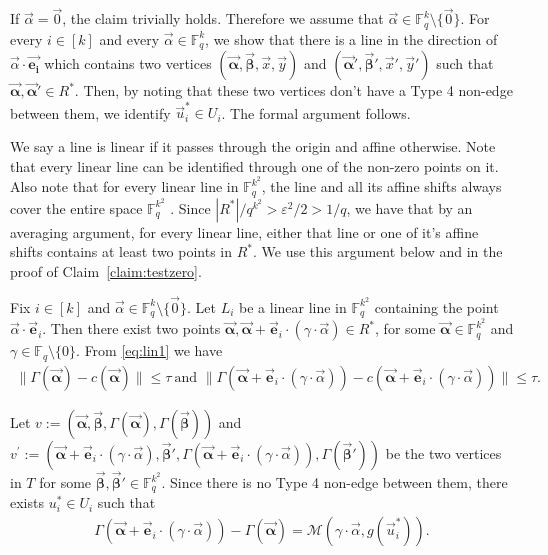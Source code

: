 \documentclass[10pt,a4paper]{article}
\newcommand{\F}{\mathbb{F}}
\renewcommand{\le}{ \leqslant}
\newcommand{\alphab}{\vec{\bm{\alpha}}}
\newcommand{\betab}{\vec{\bm{\beta}}}
\renewcommand{\kappa}{\tau}
\newcommand{\M}{\mathcal{M}}
\begin{document}
%

If $\vec{\alpha}=\vec{0}$, the claim trivially holds. Therefore we assume that $\vec{\alpha}\in\F_q^k\setminus \{\vec{0}\}$. For every $i\in[k]$ and every $\vec{\alpha}\in \F_q^k$, we show that there is a line in the direction of $\vec{\alpha}\cdot \vec{\bm{e_i}}$ which contains two vertices $(\alphab,\betab,\vec{x},\vec{y})$ and  $(\alphab',\betab',\vec{x}',\vec{y}')$ such that  $\alphab,\alphab'\in R^\ast$. Then, by noting that these two vertices don't have a Type 4 non-edge between them, we identify $\vec{u}_i^\ast\in U_i$. The formal argument follows.

We say a line is linear if it passes through the origin and affine otherwise. Note that every linear line can be identified through one of the non-zero points on it. Also note that for every linear line in $\F_q^{k^2}$, the line   and all its affine shifts always cover the entire space $\F_q^{k^2}$ . 
 Since $|{R}^\ast|/q^{k^2}>\varepsilon^2/2>1/q$, we have that  by an averaging argument,  for every linear line, either that line or one of it's affine shifts   contains at least two points in $R^\ast$. We use this argument below and in the proof of Claim~\ref{claim:testzero}.


Fix $i\in[k]$ and $\vec{\alpha}\in\F_q^k\setminus \{\vec{0}\}$. Let $L_i$ be a linear line in $\F_q^{k^2}$  containing the point  $\vec{\alpha}\cdot \vec{\bm e}_i$. Then there exist two points  $\vec{\bm{\alpha}},\vec{\bm{\alpha}}+\vec{\bm e}_i\cdot (\gamma\cdot\vec{\alpha})\in  {R}^\ast$, for some $\alphab\in\F_q^{k^2}$ and $\gamma\in \F_q\setminus\{0\}$. From \eqref{eq:lin1} we have
\begin{align}
\|\Gamma(\vec{\bm{\alpha}})-c(\vec{\bm{\alpha}})\|\le \kappa\ \text{and } \|\Gamma(\vec{\bm{\alpha}}+\vec{\bm e}_i\cdot (\gamma\cdot\vec{\alpha}))-c(\vec{\bm{\alpha}}+\vec{\bm e}_i\cdot (\gamma\cdot\vec{\alpha}))\|\le \kappa. 
\label{eq:lin2}
\end{align}



Let $v:=(\alphab,\betab,\Gamma(\alphab),\Gamma(\betab))$ and 
$v^{\prime}:=(\alphab+\vec{\bm e}_i\cdot (\gamma\cdot\vec{\alpha}),\betab',\Gamma(\alphab+\vec{\bm e}_i\cdot (\gamma\cdot\vec{\alpha})),\Gamma(\betab'))$  be the two vertices in $T$ for some $\betab,\betab'\in \F_q^{k^2}$. Since there  is no Type 4 non-edge between them,  there exists $u_i^\ast\in U_i$ such that  
\begin{align}
\Gamma(\alphab+\vec{\bm e}_i\cdot (\gamma\cdot\vec{\alpha}))-\Gamma(\alphab)=\M(\gamma\cdot\vec{\alpha},g(\vec{u}_i^\ast)).\label{eq:lin4}
\end{align}
\end{document}
